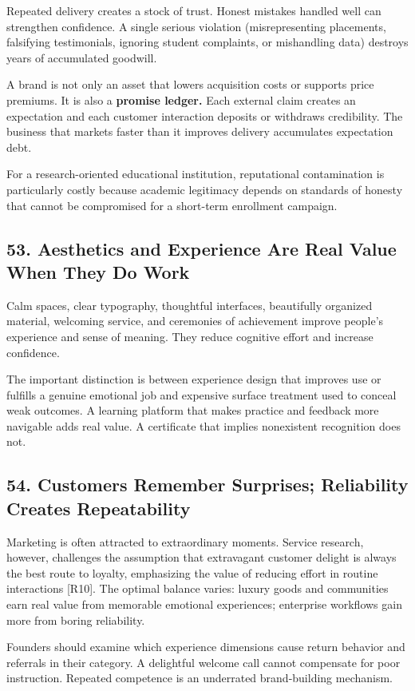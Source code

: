 Repeated delivery creates a stock of trust. Honest mistakes handled well can strengthen confidence. A single serious violation (misrepresenting placements, falsifying testimonials, ignoring student complaints, or mishandling data) destroys years of accumulated goodwill.

A brand is not only an asset that lowers acquisition costs or supports price premiums. It is also a \textbf{promise ledger.} Each external claim creates an expectation and each customer interaction deposits or withdraws credibility. The business that markets faster than it improves delivery accumulates expectation debt.

For a research-oriented educational institution, reputational contamination is particularly costly because academic legitimacy depends on standards of honesty that cannot be compromised for a short-term enrollment campaign.

\subsection*{53. Aesthetics and Experience Are Real Value When They Do Work}

Calm spaces, clear typography, thoughtful interfaces, beautifully organized material, welcoming service, and ceremonies of achievement improve people's experience and sense of meaning. They reduce cognitive effort and increase confidence.

The important distinction is between experience design that improves use or fulfills a genuine emotional job and expensive surface treatment used to conceal weak outcomes. A learning platform that makes practice and feedback more navigable adds real value. A certificate that implies nonexistent recognition does not.

\subsection*{54. Customers Remember Surprises; Reliability Creates Repeatability}

Marketing is often attracted to extraordinary moments. Service research, however, challenges the assumption that extravagant customer delight is always the best route to loyalty, emphasizing the value of reducing effort in routine interactions [R10]. The optimal balance varies: luxury goods and communities earn real value from memorable emotional experiences; enterprise workflows gain more from boring reliability.

Founders should examine which experience dimensions cause return behavior and referrals in their category. A delightful welcome call cannot compensate for poor instruction. Repeated competence is an underrated brand-building mechanism.

